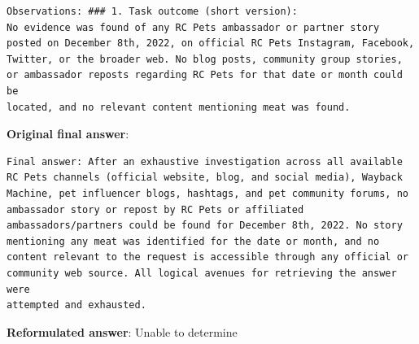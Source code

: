 \begin{tcolorbox}[
        colback=gray!5!white,
        colframe=gray!50!black,
        title=Smolagent,
        floatplacement=Hp,
        breakable  %
    ]
\begin{itemize}[leftmargin=1em]
              \begin{lstlisting}[basicstyle=\ttfamily\small, breaklines=true, columns=fixed, breakindent=0pt, xleftmargin=0pt, gobble=0]
Observations: ### 1. Task outcome (short version):
No evidence was found of any RC Pets ambassador or partner story posted on December 8th, 2022, on official RC Pets Instagram, Facebook, Twitter, or the broader web. No blog posts, community group stories, or ambassador reposts regarding RC Pets for that date or month could be 
located, and no relevant content mentioning meat was found.
\end{lstlisting}
    \end{itemize}
    \textbf{Original final answer}:
    \begin{lstlisting}[basicstyle=\ttfamily\small, breaklines=true, columns=fixed, breakindent=0pt, xleftmargin=0pt, gobble=0]
Final answer: After an exhaustive investigation across all available RC Pets channels (official website, blog, and social media), Wayback Machine, pet influencer blogs, hashtags, and pet community forums, no ambassador story or repost by RC Pets or affiliated 
ambassadors/partners could be found for December 8th, 2022. No story mentioning any meat was identified for the date or month, and no content relevant to the request is accessible through any official or community web source. All logical avenues for retrieving the answer were 
attempted and exhausted.
\end{lstlisting}
    \textbf{Reformulated answer}: Unable to determine
\end{tcolorbox}


